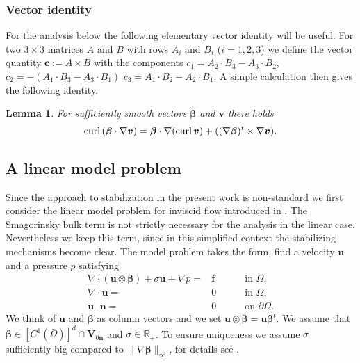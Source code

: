 \documentclass[10pt]{amsart}
\numberwithin{equation}{section}
\newtheorem{lemma}[theorem]{Lemma}
\theoremstyle{definition}
\theoremstyle{remark}
\renewcommand{\(}{\bigl(}
\renewcommand{\)}{\bigr)}
\newcommand{\curl}{{\ensuremath\mathop{\mathrm{curl}\,}}}
\newcommand{\bld}[1]{\boldsymbol{#1}}
\newcommand{\bv}{\bld{v}}
\newcommand{\bn}{\bld{n}}
\newcommand{\bu}{\bld{u}}
\newcommand{\bff}{\bld{f}}
\newcommand{\bV}{\bld{V}}
\newcommand{\bbeta}{{\bm \beta}}
\newcommand{\bc}{\bm c}
\begin{document}
\subsubsection{Vector identity}
For the analysis below the following elementary vector identity
\cite{BBG20} will
be useful. For two $3 \times 3$ matrices $A$ and $B$ with rows $A_i$
and $B_i$ ($i=1,2,3$) we define the vector quantity
 $\bc:=A \times B$ with the components $c_1= A_2 \cdot B_3-A_3 \cdot B_2$, $c_2= -(A_1
 \cdot B_3-A_3 \cdot B_1)$ $c_3= A_1 \cdot B_2-A_2 \cdot B_1$. A
 simple calculation then gives the following identity.  
\begin{lemma}\label{derivative-identity}
 For sufficiently smooth vectors $\bbeta$ and $\bv$ there holds
 \begin{equation*}
 \curl( \bbeta \cdot \nabla \bv)= \bbeta \cdot \nabla (\curl \bv)+ ((\nabla \bbeta)^t \times \nabla \bv) . 
 \end{equation*}
 \end{lemma}

\subsection{A linear model problem}
Since the approach to stabilization in the present work is non-standard we first consider the linear 
model problem for inviscid flow introduced in \cite{BBG20}. The Smagorinsky bulk term is not strictly necessary
for the analysis
in the linear case. Nevertheless we keep this term, since in this
simplified context the stabilizing mechanisms become clear. The model problem takes the form, find a velocity $\bu$ and a pressure $p$ satisfying
\begin{subequations}\label{pde}
\begin{alignat}{2}
\nabla \cdot  (\bu \otimes \bbeta) + \sigma \bu+ \nabla p = &\bff \quad  && \text{ in }  \Omega, \\
\nabla \cdot \bu=&0  \quad  && \text{ in } \Omega,  \\
\bu \cdot \bn = & 0   \quad && \text{ on } \partial \Omega.
\end{alignat}
\end{subequations}
We think of $\bu$ and $\bbeta$ as column vectors and we set $\bu
\otimes \bbeta = \bu \bbeta^t$. We assume that $\bbeta \in
[C^{1}(\bar \Omega)]^d \cap \bV_{0\bn}$ and $\sigma\in
\mathbb{R}_+$. To ensure uniqueness we assume $\sigma$
sufficiently big compared to $\|\nabla \bbeta\|_{\infty}$, for details
see \cite{BBG20}.
\end{document}
